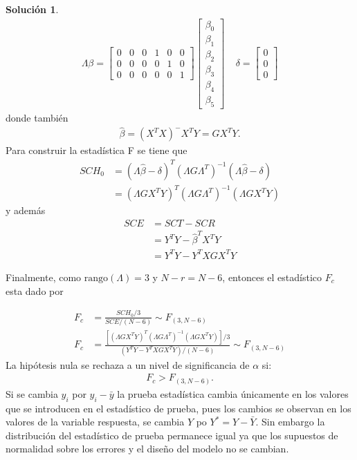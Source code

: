 \documentclass[12pt]{article}
\theoremstyle{plain}
\theoremstyle{definition}
\theoremstyle{definition}
\theoremstyle{definition}
\newtheorem*{solution}{Solución}
\begin{document}
\begin{solution}
\begin{align*}
\Lambda\beta =\begin{bmatrix}
0&0&0&1&0&0\\
0&0&0&0&1&0\\
0&0&0&0&0&1
\end{bmatrix}\begin{bmatrix}
\beta_0\\
\beta_1\\
\beta_2\\
\beta_3\\
\beta_4\\
\beta_5
\end{bmatrix} \ \ \ \ \ 
\delta =\begin{bmatrix}
0\\
0\\
0
\end{bmatrix}
\end{align*}
donde también
\begin{align*}
\hat{\beta} =(X^TX)^-X^TY=GX^TY.
\end{align*}
Para construir la estadística F se tiene que
\begin{align*}
SCH_0&= (\Lambda\hat{\beta}-\delta)^T(\Lambda G \Lambda^T)^{-1}(\Lambda\hat{\beta}-\delta)\\
&= (\Lambda GX^TY)^T(\Lambda G \Lambda^T)^{-1}(\Lambda GX^TY)
\end{align*}
y además
\begin{align*}
SCE &= SCT - SCR\\
&= Y^TY - \hat{\beta}^TX^TY\\
&=Y^TY - Y^TXGX^TY
\end{align*}

Finalmente, como $\text{rango}
(\Lambda)=3$ y $N-r=N-6$, entonces el estadístico $F_c$ esta dado por

\begin{align*}
F_c &= \frac{SCH_0/3}{SCE/(N-6)} \sim F_{(3, N-6)}\\
F_c &=  \frac{[ (\Lambda GX^TY)^T(\Lambda G \Lambda^T)^{-1}(\Lambda GX^TY)]/3}{(Y^TY - Y^TXGX^TY)/(N-6)} \sim F_{(3, N-6)}
\end{align*}
La hipótesis nula se rechaza a un nivel de significancia de $\alpha$ si:
\begin{align*}
F_c > F_{(3,N-6)}.
\end{align*}
Si se cambia $y_i$ por $y_i-\bar{y}$ la prueba estadística cambia únicamente en los valores que se introducen en el estadístico de prueba, pues los cambios se observan en los valores de la variable respuesta, se cambia $Y$ po $Y^*=Y-\bar{Y}$. Sin embargo la distribución del estadístico de prueba permanece igual ya que los supuestos de normalidad sobre los errores y el diseño del modelo no se cambian.  
\end{solution}
\end{document}
